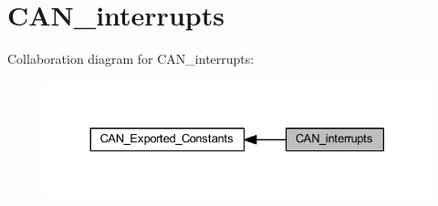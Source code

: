 \hypertarget{group___c_a_n__interrupts}{}\section{C\+A\+N\+\_\+interrupts}
\label{group___c_a_n__interrupts}
Collaboration diagram for C\+A\+N\+\_\+interrupts\+:
\nopagebreak
\begin{figure}[H]
\begin{center}
\leavevmode
\includegraphics[width=330pt]{group___c_a_n__interrupts}
\end{center}
\end{figure}
